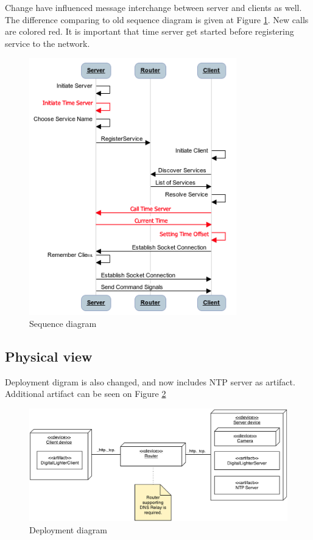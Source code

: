Change have influenced message interchange between server and clients as well. The difference comparing to old sequence diagram is given at Figure \ref{fig:sprint5_sequence_diagram}. New calls are colored red. It is important that time server get started before registering service to the network.

\begin{figure}[h]
	\centering
		\includegraphics[width=9cm]{sprint5/communication}
	\caption{Sequence diagram}
	\label{fig:sprint5_sequence_diagram}
\end{figure}




\subsection{Physical view}
Deployment digram is also changed, and now includes NTP server as artifact. Additional artifact can be seen on Figure \ref{fig:sprint5_deployment_diagram}

\begin{figure}[H]
	\centering
		\includegraphics[width=15cm]{images/deployment-diagram-sprint5}
	\caption{Deployment diagram}
	\label{fig:sprint5_deployment_diagram}
\end{figure}



